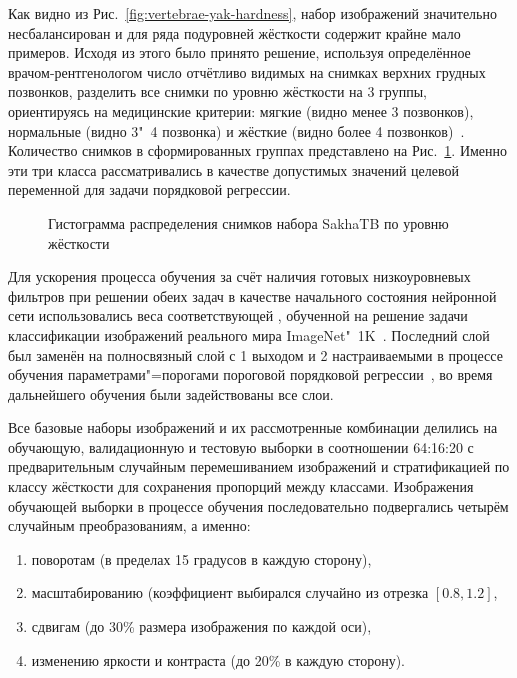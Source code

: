 Как видно из Рис.~\ref{fig:vertebrae-yak-hardness}, набор изображений значительно несбалансирован и для ряда подуровней жёсткости содержит крайне мало примеров. Исходя из этого было принято решение, используя определённое врачом-рентгенологом число отчётливо видимых на снимках верхних грудных позвонков, разделить все снимки по уровню жёсткости на 3 группы, ориентируясь на медицинские критерии: мягкие (видно менее 3 позвонков), нормальные (видно 3"~4 позвонка) и жёсткие (видно более 4 позвонков)~\cite{тимофеева2013основные, сидоров2012методика}. Количество снимков в сформированных группах представлено на Рис.~\ref{fig:hardness-yak-hardness}. Именно эти три класса рассматривались в качестве допустимых значений целевой переменной для задачи порядковой регрессии.

\begin{figure}[ht]
	\caption{Гистограмма распределения снимков набора SakhaTB по уровню жёсткости}
	\label{fig:hardness-yak-hardness}
\end{figure}

Для ускорения процесса обучения за счёт наличия готовых низкоуровневых фильтров при решении обеих задач в качестве начального состояния нейронной сети использовались веса соответствующей , обученной на решение задачи классификации изображений реального мира ImageNet"~1K~\cite{russakovsky2015imagenet}. Последний слой был заменён на полносвязный слой с 1 выходом и 2 настраиваемыми в процессе обучения параметрами"=порогами пороговой  порядковой регрессии~\cite{rennie2005loss}, во время дальнейшего обучения были задействованы все слои.

Все базовые наборы изображений и их рассмотренные комбинации делились на обучающую, валидационную и тестовую выборки в соотношении 64:16:20 с предварительным случайным перемешиванием изображений и стратификацией по классу жёсткости для сохранения пропорций между классами. Изображения обучающей выборки в процессе обучения последовательно подвергались четырём случайным преобразованиям, а именно:
\begin{enumerate}[beginpenalty=10000]
	\item поворотам (в пределах 15 градусов в каждую сторону),
	\item масштабированию (коэффициент выбирался случайно из отрезка $\left[ 0.8, 1.2 \right]$,
	\item сдвигам (до 30\% размера изображения по каждой оси),
	\item изменению яркости и контраста (до 20\% в каждую сторону).
\end{enumerate}


